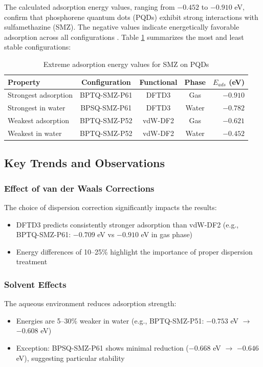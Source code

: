 \documentclass[preprint,12pt]{elsarticle}
\begin{document}
	
	The calculated adsorption energy values, ranging from $-0.452$ to $-0.910$ eV, confirm that phosphorene quantum dots (PQDs) exhibit strong interactions with sulfamethazine (SMZ). The negative values indicate energetically favorable adsorption across all configurations \cite{Khnifira2021Combined}. Table \ref{tab:top_configs} summarizes the most and least stable configurations:
	
	\begin{table}[h]
		\centering
		\caption{Extreme adsorption energy values for SMZ on PQDs}
		\label{tab:top_configs}
		\begin{tabular}{lcccr}
			\toprule
			\textbf{Property} & \textbf{Configuration} & \textbf{Functional} & \textbf{Phase} & \textbf{$E_{ads}$ (eV)} \\
			\midrule
			Strongest adsorption & BPTQ-SMZ-P61 & DFTD3 & Gas & $-0.910$ \\
			Strongest in water & BPSQ-SMZ-P61 & DFTD3 & Water & $-0.782$ \\
			Weakest adsorption & BPTQ-SMZ-P52 & vdW-DF2 & Gas & $-0.621$ \\
			Weakest in water & BPTQ-SMZ-P52 & vdW-DF2 & Water & $-0.452$ \\
			\bottomrule
		\end{tabular}
	\end{table}
	
	\subsection{Key Trends and Observations}
	
	\subsubsection{Effect of van der Waals Corrections}
	The choice of dispersion correction significantly impacts the results:
	\begin{itemize}
		\item DFTD3 predicts consistently stronger adsorption than vdW-DF2 (e.g., BPTQ-SMZ-P61: $-0.709$ eV vs $-0.910$ eV in gas phase)
		\item Energy differences of 10--25\% highlight the importance of proper dispersion treatment
	\end{itemize}
	
	\subsubsection{Solvent Effects}
	The aqueous environment reduces adsorption strength:
	\begin{itemize}
		\item Energies are 5--30\% weaker in water (e.g., BPTQ-SMZ-P51: $-0.753$ eV $\rightarrow$ $-0.608$ eV)
		\item Exception: BPSQ-SMZ-P61 shows minimal reduction ($-0.668$ eV $\rightarrow$ $-0.646$ eV), suggesting particular stability
	\end{itemize}
	
\end{document}
